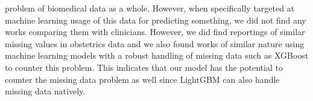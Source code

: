 problem of biomedical data as a whole. However, when specifically targeted at machine learning usage of this data for predicting something, we did not find any works comparing them with clinicians. However, we did find reportings of similar missing values in obstetrics data \cite{venkateshMachineLearningStatistical2020} and we also found works of similar nature using machine learning models with a robust handling of missing data such as XGBoost \cite{bitarMachineLearningAlgorithm2023} to counter this problem. This indicates that our model has the potential to counter the missing data problem as well since LightGBM can also handle missing data natively.

